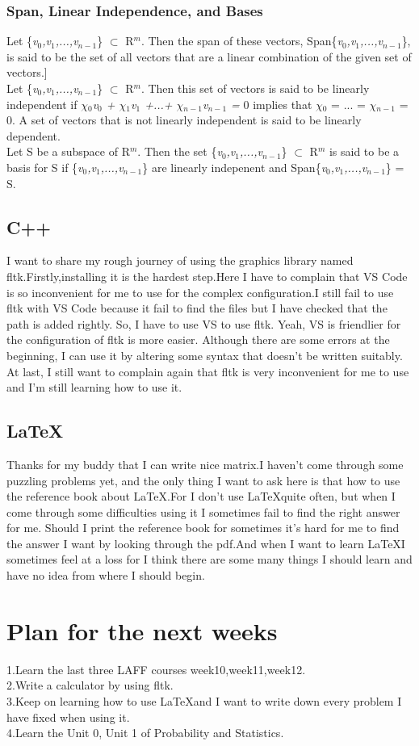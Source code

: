 \documentclass{article}
\begin{document}
\subsubsection{Span, Linear Independence, and Bases}
Let \{\emph{{v$_{0}$,v$_{1}$,...,v$_{n-1}$}}\} $\subset$ R$^{m}$. Then the span of these vectors, Span\{\emph{{v$_{0}$,v$_{1}$,...,v$_{n-1}$}}\}, is said to be the set of all vectors that are a linear combination of the given set of vectors.]\\
Let \{\emph{{v$_{0}$,v$_{1}$,...,v$_{n-1}$}}\} $\subset$ R$^{m}$. Then this set of vectors is said to be linearly independent if \emph{$\chi$$_{0}$v$_{0}$ + $\chi$$_{1}$v$_{1}$ +...+ $\chi$$_{n-1}$v$_{n-1}$ =  }0  implies that $\chi$$_{0}$ = ... = $\chi$$_{n-1}$ = 0. A set of vectors that is not linearly independent is said to be linearly dependent.\\
Let S be a subspace of R$^{m}$. Then the set \{\emph{{v$_{0}$,v$_{1}$,...,v$_{n-1}$}}\} $\subset$ R$^{m}$ is said to be a basis for S if \{\emph{{v$_{0}$,v$_{1}$,...,v$_{n-1}$}}\} are linearly indepenent and Span\{\emph{{v$_{0}$,v$_{1}$,...,v$_{n-1}$}}\} = S.

\subsection{C++}
I want to share my rough journey of using the graphics library named fltk.Firstly,installing it is the hardest step.Here I have to complain that VS Code is so inconvenient for me to use for the complex configuration.I still fail to use fltk with VS Code because it fail to find the files but I have checked that the path is added rightly. So, I have to use VS to use fltk. Yeah, VS is friendlier for the configuration of fltk is more easier. Although there are some errors at the beginning, I can use it by altering some syntax that doesn't be written suitably. At last, I still want to complain again that fltk is very inconvenient for me to use and I'm still learning how to use it.

\subsection{\LaTeX}
Thanks for my buddy that I can write nice matrix.I haven't come through some puzzling problems yet, and the only thing I want to ask here is that how to use the reference book about \LaTeX.For I don't use \LaTeX quite often, but when I come through some difficulties using it I sometimes fail to find the right answer for me. Should I print the reference book for sometimes it's hard for me to find the answer I want by looking through the pdf.And when I want to learn \LaTeX I sometimes feel at a loss for I think there are some many things I should learn and have no idea from where I should begin.

\section{Plan for the next weeks}

1.Learn the last three LAFF courses week10,week11,week12.\\
2.Write a calculator by using fltk.\\
3.Keep on learning how to use \LaTeX and I want to write down every problem I have fixed when using it.\\
4.Learn the Unit 0, Unit 1 of Probability and Statistics.
\end{document}
